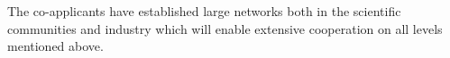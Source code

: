 \documentclass[12pt]{article}
\begin{document}
{\color{blue}The co-applicants have established large networks both in the scientific communities and industry which will enable extensive cooperation on all levels mentioned above.}
%
%
%
%
%
\end{document}
